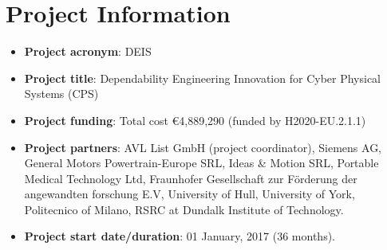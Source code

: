 \section{Project Information}
\begin{itemize}
	\item \textbf{Project acronym}: DEIS
	\item \textbf{Project title}: Dependability Engineering Innovation for Cyber Physical Systems (CPS)
	\item \textbf{Project funding}: Total cost \euro 4,889,290 (funded by H2020-EU.2.1.1)
	\item \textbf{Project partners}: AVL List GmbH (project coordinator), Siemens AG, General Motors Powertrain-Europe SRL, Ideas \& Motion SRL, Portable Medical Technology Ltd, Fraunhofer Gesellschaft zur F{\"o}rderung der angewandten forschung E.V, University of Hull, University of York, Politecnico of Milano, RSRC at Dundalk Institute of Technology.
	\item \textbf{Project start date/duration}: 01 January, 2017 (36 months).
\end{itemize}
